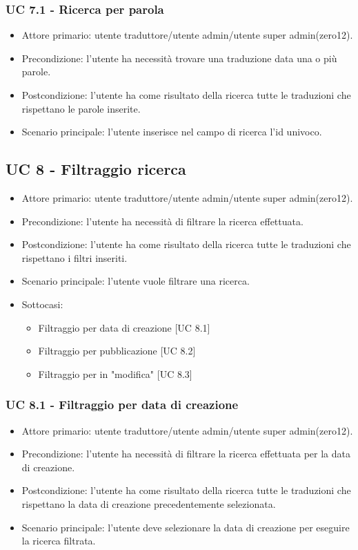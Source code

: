     \subsubsection{UC 7.1 - Ricerca per parola}
        \begin{itemize}
            \item Attore primario: utente traduttore/utente admin/utente super admin(zero12).
            \item Precondizione: l'utente ha necessità trovare una traduzione data una o più parole.
            \item Postcondizione: l'utente ha come risultato della ricerca tutte le traduzioni che rispettano le parole inserite.
            \item Scenario principale: l'utente inserisce nel campo di ricerca l'id univoco.
        \end{itemize}
\subsection{UC 8 - Filtraggio ricerca}%
    \begin{itemize}
        \item Attore primario: utente traduttore/utente admin/utente super admin(zero12).
        \item Precondizione: l'utente ha necessità di filtrare la ricerca effettuata.
        \item Postcondizione: l'utente ha come risultato della ricerca tutte le traduzioni che rispettano i filtri inseriti.
        \item Scenario principale: l'utente vuole filtrare una ricerca.
        \item Sottocasi:
            \begin{itemize}
                \item Filtraggio per data di creazione [UC 8.1]
                \item Filtraggio per pubblicazione [UC 8.2]
                \item Filtraggio per in "modifica" [UC 8.3]
            \end{itemize}
    \end{itemize}  
    \subsubsection{UC 8.1 - Filtraggio per data di creazione}
        \begin{itemize}
            \item Attore primario: utente traduttore/utente admin/utente super admin(zero12).
            \item Precondizione: l'utente ha necessità di filtrare la ricerca effettuata per la data di creazione.
            \item Postcondizione: l'utente ha come risultato della ricerca tutte le traduzioni che rispettano la data di creazione precedentemente selezionata. 
            \item Scenario principale: l'utente deve selezionare la data di creazione per eseguire la ricerca filtrata.
        \end{itemize}
